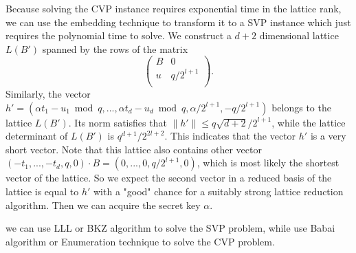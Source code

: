 Because solving the CVP instance requires exponential time in the lattice rank,
 we can use the embedding technique \cite{Nguyen1999} to transform it to a SVP instance which just requires the polynomial time to solve.
We construct a $d+2$ dimensional lattice $L(B')$ spanned by the rows of the matrix
$$
\left(
  \begin{array}{cc}
    B & 0 \\
    u & q/2^{l+1} \\
  \end{array}
\right).
$$
Similarly, the vector $h' = (\alpha t_1 - u_1 \bmod q, ..., \alpha t_d - u_d \bmod q, \alpha /2^{l+1}, -q/2^{l+1})$ belongs to the lattice $L(B')$.
 Its norm satisfies that $\|h'\| \leq q\sqrt{d+2}/2^{l+1}$,
  while the lattice determinant of $L(B')$ is $q^{d+1}/2^{2l+2}$.
   This indicates that the vector $h'$ is a very short vector.
Note that this lattice also contains other vector $(-t_1, ..., -t_d, q, 0)\cdot B = (0, ..., 0, q/2^{l+1}, 0)$,
 which is most likely the shortest vector of the lattice.
So we expect the second vector in a reduced basis of the lattice is equal to $h'$ with a "good" chance for a suitably strong lattice reduction algorithm.
Then we can acquire the secret key $\alpha$.

we can use LLL \cite{Lenstra1982} or BKZ \cite{Schnorr1994} algorithm to solve the SVP problem, while use Babai \cite{Babai1986} algorithm or Enumeration technique to solve the CVP problem.





